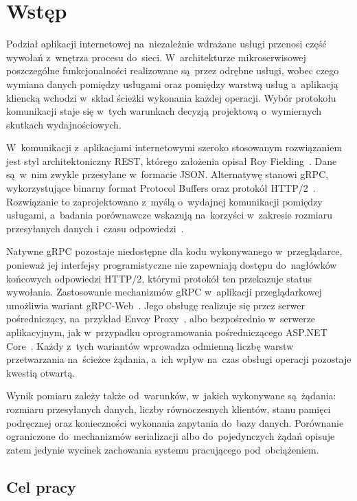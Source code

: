 \cleardoublepage
\chapter{Wstęp}
\label{cha:Wstep}

Podział aplikacji internetowej na~niezależnie wdrażane usługi przenosi część wywołań z~wnętrza procesu do~sieci. W~architekturze mikroserwisowej poszczególne funkcjonalności realizowane są~przez odrębne usługi, wobec czego wymiana danych pomiędzy usługami oraz pomiędzy warstwą usług a~aplikacją kliencką wchodzi w~skład ścieżki wykonania każdej operacji. Wybór protokołu komunikacji staje się w~tych warunkach decyzją projektową o~wymiernych skutkach wydajnościowych.

W~komunikacji z~aplikacjami internetowymi szeroko stosowanym rozwiązaniem jest styl architektoniczny REST, którego założenia opisał Roy Fielding~\cite{bib:Fielding2000}. Dane są~w~nim zwykle przesyłane w~formacie JSON. Alternatywę stanowi gRPC, wykorzystujące binarny format Protocol Buffers oraz protokół HTTP/2~\cite{bib:gRPCDocs}. Rozwiązanie to zaprojektowano z~myślą o~wydajnej komunikacji pomiędzy usługami, a~badania porównawcze wskazują na~korzyści w~zakresie rozmiaru przesyłanych danych i~czasu odpowiedzi~\cite{bib:Niswar2024}.

Natywne gRPC pozostaje niedostępne dla kodu wykonywanego w~przeglądarce, ponieważ jej interfejsy programistyczne nie zapewniają dostępu do~nagłówków końcowych odpowiedzi HTTP/2, którymi protokół ten przekazuje status wywołania. Zastosowanie mechanizmów gRPC w~aplikacji przeglądarkowej umożliwia wariant gRPC-Web~\cite{bib:gRPCWeb}. Jego obsługę realizuje się przez serwer pośredniczący, na~przykład Envoy Proxy~\cite{bib:EnvoyProxy}, albo bezpośrednio w~serwerze aplikacyjnym, jak w~przypadku oprogramowania pośredniczącego ASP.NET Core~\cite{bib:GrpcWebAspNet}. Każdy z~tych wariantów wprowadza odmienną liczbę warstw przetwarzania na~ścieżce żądania, a~ich wpływ na~czas obsługi operacji pozostaje kwestią otwartą.

Wynik pomiaru zależy także od~warunków, w~jakich wykonywane są~żądania: rozmiaru przesyłanych danych, liczby równoczesnych klientów, stanu pamięci podręcznej oraz konieczności wykonania zapytania do~bazy danych. Porównanie ograniczone do~mechanizmów serializacji albo do~pojedynczych żądań opisuje zatem jedynie wycinek zachowania systemu pracującego pod~obciążeniem.

\section{Cel pracy}
\label{sec:CelPracy}

